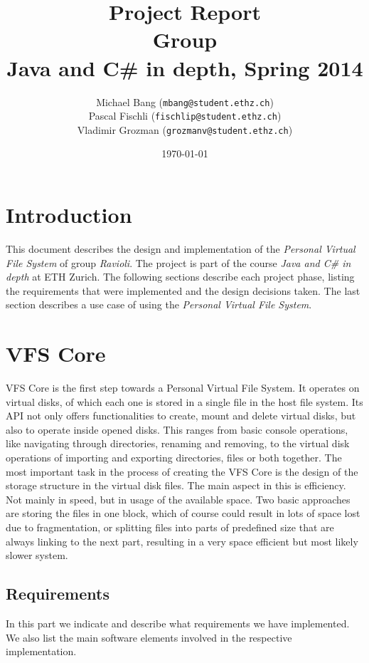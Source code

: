 \documentclass[a4paper,12pt]{article}
\title{
Project Report \\
Group \groupname \\
\vspace{5mm}
\large Java and C\# in depth, Spring 2014
}
\author{
Michael Bang (\texttt{mbang@student.ethz.ch}) \\
Pascal Fischli (\texttt{fischlip@student.ethz.ch}) \\
Vladimir Grozman (\texttt{grozmanv@student.ethz.ch})
}
\date{\today}
\newcommand{\groupname}{Ravioli\xspace}
\begin{document}
\maketitle

\section{Introduction}

This document describes the design and implementation of the \emph{Personal Virtual File System} of group \emph{\groupname}. The project is part of the course \emph{Java and C\# in depth} at ETH Zurich. The following sections describe each project phase, listing the requirements that were implemented and the design decisions taken. The last section describes a use case of using the \emph{Personal Virtual File System}.


\section{VFS Core}
VFS Core is the first step towards a Personal Virtual File System. It operates on virtual disks, of which each one is stored in a single file in the host file system. Its API not only offers functionalities to create, mount and delete virtual disks, but also to operate inside opened disks. This ranges from basic console operations, like navigating through directories, renaming and removing, to the virtual disk operations of importing and exporting directories, files or both together.\newline
The most important task in the process of creating the VFS Core is the design of the storage structure in the virtual disk files. The main aspect in this is efficiency. Not mainly in speed, but in usage of the available space. Two basic approaches are storing the files in one block, which of course could result in lots of space lost due to fragmentation, or splitting files into parts of predefined size that are always linking to the next part, resulting in a very space efficient but most likely slower system.


\subsection{Requirements}
In this part we indicate and describe what requirements we have implemented. We also list the main software elements involved in the respective implementation.
\end{document}
